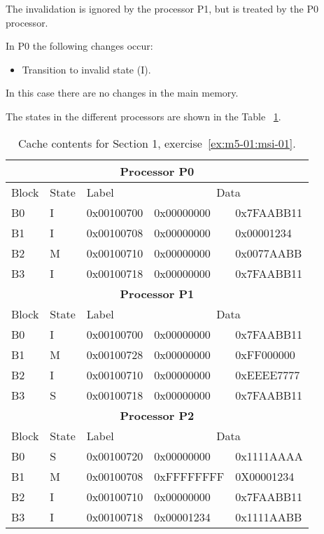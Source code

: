The invalidation is ignored by the processor P1, but is treated by the
P0 processor.

In P0 the following changes occur:


\begin{itemize}

\item Transition to invalid state (I).

\end{itemize}

In this case there are no changes in the main memory.

The states in the different processors are shown in the Table ~\ref{tab:ex:m5-01:msi-01:1}.

\begin{table}[htbp]

\begin{tabular}{|l|l|l|l|l|}

\hline
\multicolumn{5}{|c|}{\textbf{Processor P0}}\\
\hline
Block & State & Label & \multicolumn{2}{c|}{Data}\\
\hline
\hline
B0 & I & 0x00100700 & 0x00000000 & 0x7FAABB11\\
\hline
B1 & I & 0x00100708 & 0x00000000 & 0x00001234\\
\hline
B2 & M & 0x00100710 & 0x00000000 & 0x0077AABB\\
\hline
B3 & I & 0x00100718 & 0x00000000 & 0x7FAABB11\\
\hline

\hline
\multicolumn{5}{|c|}{\textbf{Processor P1}}\\
\hline
Block & State & Label & \multicolumn{2}{c|}{Data}\\
\hline
\hline

B0 & I & 0x00100700 & 0x00000000 & 0x7FAABB11\\
\hline
B1 & M & 0x00100728 & 0x00000000 & 0xFF000000\\
\hline
B2 & I & 0x00100710 & 0x00000000 & 0xEEEE7777\\
\hline
B3 & S & 0x00100718 & 0x00000000 & 0x7FAABB11\\
\hline


\hline
\multicolumn{5}{|c|}{\textbf{Processor P2}}\\
\hline
Block & State & Label & \multicolumn{2}{c|}{Data}\\
\hline
\hline

B0 & S & 0x00100720 & 0x00000000 & 0x1111AAAA\\
\hline
B1 & {\color{red}M} & 0x00100708 & {\color{red}0xFFFFFFFF} & 0X00001234\\
\hline
B2 & I & 0x00100710 & 0x00000000 & 0x7FAABB11\\
\hline
B3 & I & 0x00100718 & 0x00001234 & 0x1111AABB\\
\hline


\end{tabular}

\caption{Cache contents for Section 1, exercise~\ref{ex:m5-01:msi-01}.}
\label{tab:ex:m5-01:msi-01:1}

\end{table}

